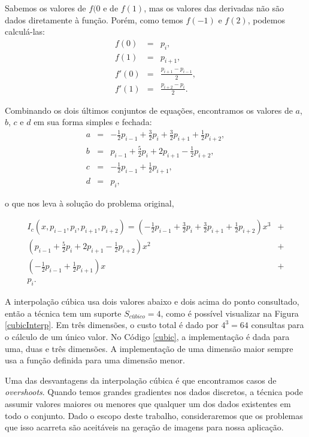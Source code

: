 \documentclass[12pt, a4paper, oneside]{book}
\begin{document}
Sabemos os valores de $f(0$ e de $f(1)$, mas os valores das derivadas não são dados diretamente à função. Porém, como temos $f(-1)$ e $f(2)$, podemos calculá-las:
\[
\begin{array}{rcl}
f(0) & = & p_{i}, \\
f(1) & = & p_{i+1}, \\
f'(0) & = & \frac{p_{i+1} - p_{i-1}}{2}, \\
f'(1) & = & \frac{p_{i+2} - p_{i}}{2}.
\end{array} 
\]

Combinando os dois últimos conjuntos de equações, encontramos os valores de $a$, $b$, $c$ e $d$ em sua forma simples e fechada:
\[
\begin{array}{rcl}
a & = & -\frac{1}{2}p_{i-1} +\frac{3}{2}p_{i} +\frac{3}{2}p_{i+1} +\frac{1}{2}p_{i+2}, \\
b & = & p_{i-1} +\frac{5}{2}p_{i} + 2p_{i+1} -\frac{1}{2}p_{i+2}, \\
c & = & -\frac{1}{2}p_{i-1} + \frac{1}{2}p_{i+1}, \\
d & = & p_{i},
\end{array} 
\]

o que nos leva à solução do problema original,


\begin{align*}
 I_{c} (x, p_{i-1}, p_{i}, p_{i+1}, p_{i+2}) = \left( -\frac{1}{2}p_{i-1} +\frac{3}{2}p_{i} +\frac{3}{2}p_{i+1} +\frac{1}{2}p_{i+2} \right)x^3 &+ \\
 \left( p_{i-1} +\frac{5}{2}p_{i} + 2p_{i+1} -\frac{1}{2}p_{i+2} \right)x^2 &+ \\ \left( -\frac{1}{2}p_{i-1} + \frac{1}{2}p_{i+1} \right)x &+ \\ p_{i}.
 \end{align*}

A interpolação cúbica usa dois valores abaixo e dois acima do ponto consultado, então a técnica tem um suporte $S_{cúbico} = 4$, como é possível visualizar na Figura \ref{cubicInterp}. Em três dimensões, o custo total é dado por $4^3 = 64$ consultas para o cálculo de um único valor. No Código \ref{cubic}, a implementação é dada para uma, duas e três dimensões. A implementação de uma dimensão maior sempre usa a função definida para uma dimensão menor.

Uma das desvantagens da interpolação cúbica é que encontramos casos de {\it overshoots}. Quando temos grandes gradientes nos dados discretos, a técnica pode assumir valores maiores ou menores que qualquer um dos dados existentes em todo o conjunto. Dado o escopo deste trabalho, consideraremos que os problemas que isso acarreta são aceitáveis na geração de imagens para nossa aplicação.
\end{document}
